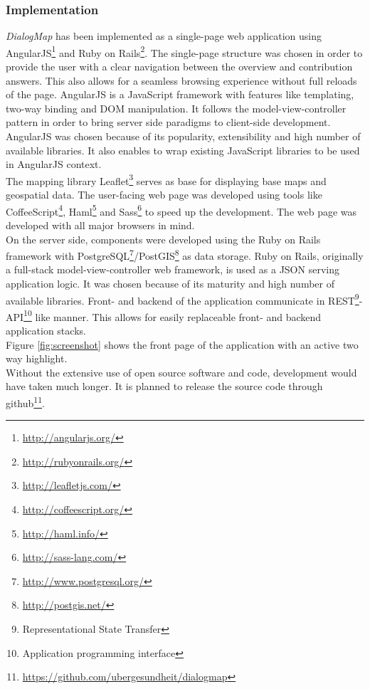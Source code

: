 \documentclass{sigchi}
\begin{document}
\subsubsection{Implementation}
\textit{DialogMap} has been implemented as a single-page web application using AngularJS\footnote{\url{http://angularjs.org/}} and Ruby on Rails\footnote{\url{http://rubyonrails.org/}}. The single-page structure was chosen in order to provide the user with a clear navigation between the overview and contribution answers. This also allows for a seamless browsing experience without full reloads of the page. AngularJS is a JavaScript framework with features like templating, two-way binding and DOM manipulation. It follows the model-view-controller pattern in order to bring server side paradigms to client-side development. AngularJS was chosen because of its popularity, extensibility and high number of available libraries. It also enables to wrap existing JavaScript libraries to be used in AngularJS context.\\
The mapping library Leaflet\footnote{\url{http://leafletjs.com/}} serves as base for displaying base maps and geospatial data. The user-facing web page was developed using tools like CoffeeScript\footnote{\url{http://coffeescript.org/}}, Haml\footnote{\url{http://haml.info/}} and Sass\footnote{\url{http://sass-lang.com/}} to speed up the development. The web page was developed with all major browsers in mind.\\
On the server side, components were developed using the Ruby on Rails framework with PostgreSQL\footnote{\url{http://www.postgresql.org/}}/PostGIS\footnote{\url{http://postgis.net/}} as data storage. Ruby on Rails, originally a full-stack model-view-controller web framework, is used as a JSON serving application logic. It was chosen because of its maturity and high number of available libraries. Front- and backend of the application communicate in REST\footnote{Representational State Transfer}-API\footnote{Application programming interface} like manner. This allows for easily replaceable front- and backend application stacks.\\
Figure \ref{fig:screenshot} shows the front page of the application with an active two way highlight.\\
Without the extensive use of open source software and code, development would have taken much longer. It is planned to release the source code through github\footnote{\url{https://github.com/ubergesundheit/dialogmap}}.
\end{document}
